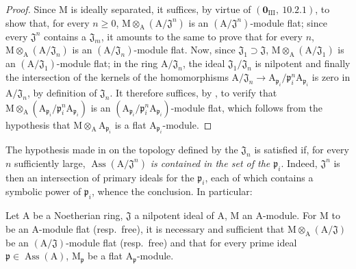\begin{proof}
Since $\mathrm{M}$ is ideally separated, it suffices, by virtue of $(\mathbf{0}_{\mathrm{III}},~10.2.1)$, to show
that, for every $n\geq 0$, $\mathrm{M}\otimes_\mathrm{A}(\mathrm{A}/\mathfrak{J}^n)$ is an $(\mathrm{A}/\mathfrak{J}^n)$-module flat; since every $\mathfrak{J}^n$ contains
a $\mathfrak{J}_m$, it amounts to the same to prove that for every $n$, $\mathrm{M}\otimes_\mathrm{A}(\mathrm{A}/\mathfrak{J}_n)$ is an $(\mathrm{A}/\mathfrak{J}_n)$-module
flat. Now, since $\mathfrak{J}_1\supset\mathfrak{J}$, $\mathrm{M}\otimes_\mathrm{A}(\mathrm{A}/\mathfrak{J}_1)$ is an $(\mathrm{A}/\mathfrak{J}_1)$-module flat; in the ring $\mathrm{A}/\mathfrak{J}_n$,
the ideal $\mathfrak{J}_1/\mathfrak{J}_n$ is nilpotent and finally the intersection of the kernels of the homomorphisms
$\mathrm{A}/\mathfrak{J}_n\to\mathrm{A}_{\mathfrak{p}_i}/\mathfrak{p}_i^n\mathrm{A}_{\mathfrak{p}_i}$ is zero in $\mathrm{A}/\mathfrak{J}_n$, by definition of $\mathfrak{J}_n$. It therefore suffices, by ,
to verify that $\mathrm{M}\otimes_\mathrm{A}(\mathrm{A}_{\mathfrak{p}_i}/\mathfrak{p}_i^n\mathrm{A}_{\mathfrak{p}_i})$ is an $(\mathrm{A}_{\mathfrak{p}_i}/\mathfrak{p}_i^n\mathrm{A}_{\mathfrak{p}_i})$-module flat, which follows from
the hypothesis that $\mathrm{M}\otimes_\mathrm{A}\mathrm{A}_{\mathfrak{p}_i}$ is a flat $\mathrm{A}_{\mathfrak{p}_i}$-module.
\end{proof}

\begin{remark}[11.4.8]
\label{IV.11.4.8}
The hypothesis made in  on the topology defined
by the $\mathfrak{J}_n$ is satisfied if, for every $n$ sufficiently large, $\operatorname{Ass}(\mathrm{A}/\mathfrak{J}^n)$ \emph{is contained in the set
of the $\mathfrak{p}_i$}. Indeed, $\mathfrak{J}^n$ is then an intersection of primary ideals for the $\mathfrak{p}_i$, each of which
contains a symbolic power of $\mathfrak{p}_i$, whence the conclusion. In particular:
\end{remark}

\begin{corollary}[11.4.9]
\label{IV.11.4.9}
Let $\mathrm{A}$ be a Noetherian ring, $\mathfrak{J}$ a nilpotent ideal of $\mathrm{A}$, $\mathrm{M}$ an
$\mathrm{A}$-module. For $\mathrm{M}$ to be an $\mathrm{A}$-module flat \textup{(resp.}\ free\textup{)}, it is necessary and sufficient that $\mathrm{M}\otimes_\mathrm{A}(\mathrm{A}/\mathfrak{J})$
be an $(\mathrm{A}/\mathfrak{J})$-module flat \textup{(resp.}\ free\textup{)} and that for every prime ideal $\mathfrak{p}\in\operatorname{Ass}(\mathrm{A})$, $\mathrm{M}_\mathfrak{p}$ be a flat
$\mathrm{A}_\mathfrak{p}$-module.
\end{corollary}

